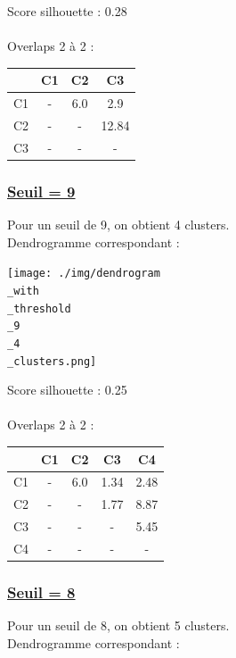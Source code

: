 \documentclass{article}
\begin{document}
\noindent Score silhouette : 0.28\\\\
Overlaps 2 à 2 :\\

\begin{center}
\begin{tabular}{|c|c|c|c|}
\hline
& C1 & C2 & C3 \\
\hline
C1 & - & 6.0 & 2.9 \\
\hline
C2 & - & - & 12.84 \\
\hline
C3 & - & - & - \\
\hline
\end{tabular}
\end{center}


\subsubsection*{\underline{Seuil = 9}}
Pour un seuil de 9, on obtient 4 clusters.\\
Dendrogramme correspondant :

\begin{center}
    \texttt{[image: ./img/dendrogram\\\_with\\\_threshold\\\_9\\\_4\\\_clusters.png]}
\end{center}

\noindent Score silhouette : 0.25\\\\
Overlaps 2 à 2 :\\

\begin{center}
\begin{tabular}{|c|c|c|c|c|}
\hline
& C1 & C2 & C3 & C4 \\
\hline
C1 & - & 6.0 & 1.34 & 2.48 \\
\hline
C2 & - & - & 1.77 & 8.87 \\
\hline
C3 & - & - & - & 5.45 \\
\hline
C4 & - & - & - & - \\
\hline
\end{tabular}
\end{center}

\subsubsection*{\underline{Seuil = 8}}
Pour un seuil de 8, on obtient 5 clusters.\\
Dendrogramme correspondant :
\end{document}
